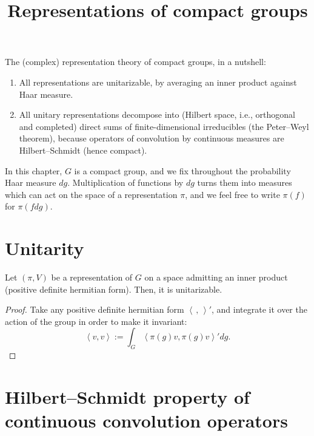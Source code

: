 

%


\title{Representations of compact groups}


\maketitle

\label{section-phantom}


\tableofcontents


The (complex) representation theory of compact groups, in a nutshell:
\begin{enumerate}
 \item All representations are unitarizable, by averaging an inner product against Haar measure.
 \item All unitary representations decompose into (Hilbert space, i.e., orthogonal and completed) direct sums of finite-dimensional irreducibles (the Peter--Weyl theorem), because operators of convolution by continuous measures are Hilbert--Schmidt (hence compact).
\end{enumerate}


In this chapter, $G$ is a compact group, and we fix throughout the probability Haar measure $dg$. Multiplication of functions by $dg$ turns them into measures which can act on the space of a representation $\pi$, and we feel free to write $\pi(f)$ for $\pi(f dg)$. 

\section{Unitarity}
\label{section-unitarity}

\begin{proposition}
\label{proposition-compact-unitarizable}
 Let $(\pi,V)$ be a representation of $G$ on a space admitting an inner product (positive definite hermitian form). Then, it is unitarizable.
\end{proposition}

\begin{proof}
 Take any positive definite hermitian form $\left< \, , \,\right>'$, and integrate it over the action of the group in order to make it invariant:
 $$ \left<  v, v\right>:= \int_G \left< \pi(g) v, \pi(g) v\right>' dg.$$
\end{proof}

\section{Hilbert--Schmidt property of continuous convolution operators}
\label{section-Hilbert-Schmidt}

